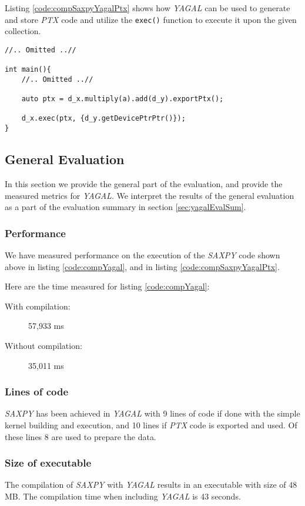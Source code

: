 Listing \ref{code:compSaxpyYagalPtx} shows how \textit{YAGAL} can be used to generate and store \textit{PTX} code and utilize the \texttt{exec()} function to execute it upon the given collection.

\begin{lstlisting}[caption={\textit{YAGAL} \textit{SAXPY} utilizing \textit{PTX} generation.}, label={code:compSaxpyYagalPtx}]
//.. Omitted ..//

int main(){
    //.. Omitted ..//

    auto ptx = d_x.multiply(a).add(d_y).exportPtx();

    d_x.exec(ptx, {d_y.getDevicePtrPtr()});
}
\end{lstlisting}

\subsection{General Evaluation}
In this section we provide the general part of the evaluation, and provide the measured metrics for \textit{YAGAL}. We interpret the results of the general evaluation as a part of the evaluation summary in section \ref{sec:yagalEvalSum}.

\subsubsection[*]{Performance}
We have measured performance on the execution of the \textit{SAXPY} code shown above in listing \ref{code:compYagal}, and in listing \ref{code:compSaxpyYagalPtx}.

Here are the time measured for listing \ref{code:compYagal}:
\begin{description}
    \item[With compilation:] 57,933 ms
    \item[Without compilation:] 35,011 ms
\end{description}

\subsubsection[*]{Lines of code}
\textit{SAXPY} has been achieved in \textit{YAGAL} with 9 lines of code if done with the simple kernel building and execution, and 10 lines if \textit{PTX} code is exported and used. Of these lines 8 are used to prepare the data.

\subsubsection[*]{Size of executable}
The compilation of \textit{SAXPY} with \textit{YAGAL} results in an executable with size of 48 MB. The compilation time when including \textit{YAGAL} is 43 seconds.

